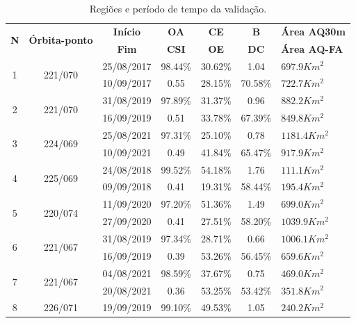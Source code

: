 \documentclass[cic,tc]{iiufrgs}
\begin{document}
\begin{table}[!htb]
\centering
\caption{Regiões e período de tempo da validação.}
\begin{tabular}{ccccccl}
\toprule
 \multirow{2}{*}{\textbf{N}} & \multirow{2}{*}{\textbf{Órbita-ponto}} & \textbf{Início} & \textbf{OA}  & \textbf{CE} & \textbf{B} & \textbf{Área AQ30m} \\
 \cline{3-7}
 \noalign{\smallskip} %
                                        & & \textbf{Fim}    & \textbf{CSI} & \textbf{OE} & \textbf{DC} & \textbf{Área AQ-FA} \\
\midrule
\multirow{2}{*}{1} & \multirow{2}{*}{221/070} & 25/08/2017 & 98.44\% & 30.62\% & 1.04 & $697.9Km^2$ \\
                         &  & 10/09/2017 & 0.55 & 28.15\% & 70.58\% & $722.7Km^2$ \\
\hline
\multirow{2}{*}{2} & \multirow{2}{*}{221/070} & 31/08/2019 & 97.89\% & 31.37\% & 0.96 & $882.2Km^2$ \\
                         &  & 16/09/2019 & 0.51 & 33.78\% & 67.39\% & $849.8Km^2$ \\
\hline
\multirow{2}{*}{3} & \multirow{2}{*}{224/069} & 25/08/2021 & 97.31\% & 25.10\% & 0.78 & $1181.4Km^2$ \\
                         &  & 10/09/2021 & 0.49 & 41.84\% & 65.47\% & $917.9Km^2$ \\
\hline
\multirow{2}{*}{4} & \multirow{2}{*}{225/069} & 24/08/2018 & 99.52\% & 54.18\% & 1.76 & $111.1Km^2$ \\
                         &  & 09/09/2018 & 0.41 & 19.31\% & 58.44\% & $195.4Km^2$ \\
\hline
\multirow{2}{*}{5} & \multirow{2}{*}{220/074} & 11/09/2020 & 97.20\% & 51.36\% & 1.49 & $699.0Km^2$ \\
                         &  & 27/09/2020 & 0.41 & 27.51\% & 58.20\% & $1039.9Km^2$ \\
\hline
\multirow{2}{*}{6} & \multirow{2}{*}{221/067} & 31/08/2019 & 97.34\% & 28.71\% & 0.66 & $1006.1Km^2$ \\
                         &  & 16/09/2019 & 0.39 & 53.26\% & 56.45\% & $659.6Km^2$ \\
\hline
\multirow{2}{*}{7} & \multirow{2}{*}{221/067} & 04/08/2021 & 98.59\% & 37.67\% & 0.75 & $469.0Km^2$ \\
                         &  & 20/08/2021 & 0.36 & 53.25\% & 53.42\% & $351.8Km^2$ \\
\hline
\multirow{2}{*}{8} & \multirow{2}{*}{226/071} & 19/09/2019 & 99.10\% & 49.53\% & 1.05 & $240.2Km^2$ \\

\end{tabular}
\end{table}
\end{document}
